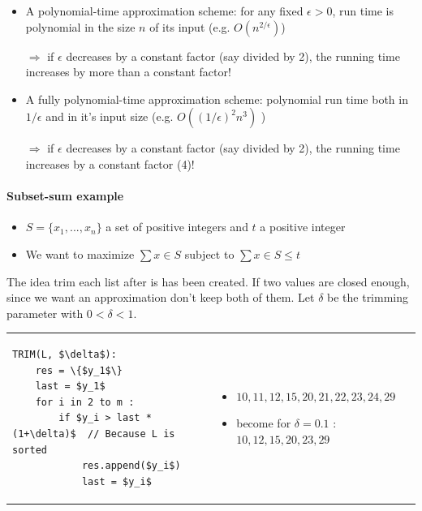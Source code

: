 \begin{itemize}
    \item A polynomial-time approximation scheme: for any fixed
        $\epsilon > 0$, run time is polynomial in the size $n$ of its input
        (e.g. $O(n^{2/\epsilon} )$)
\begin{center}
    $\Rightarrow$ if $\epsilon$ decreases by a constant factor (say divided by 2),
the running time increases by more than a constant
factor!
\end{center}

    \item A fully polynomial-time approximation scheme:
        polynomial run time both in $1/\epsilon$ and in it’s input size
        (e.g. $O((1/\epsilon)^2 n^3)$ )
\begin{center}
    $\Rightarrow$ if $\epsilon$ decreases by a constant factor (say divided by 2),
    the running time increases by a constant factor (4)!
\end{center}

\end{itemize}

\paragraph{Subset-sum example}
\begin{itemize}
\item $S= \{x_1,...,x_n\}$ a set of positive integers and $t$ a positive integer 
    \item We want to
maximize $\sum x \in S$ subject to $\sum x \in S \leq t$
\end{itemize}


The idea trim each list after is has been created. If two
values are closed enough, since we want an
approximation don’t keep both of them. Let $\delta$ be the
trimming parameter with $0 < \delta < 1$.

\begin{tabular}{m{7cm}m{7cm}}
\begin{lstlisting}[mathescape]
TRIM(L, $\delta$):
    res = \{$y_1$\}
    last = $y_1$
    for i in 2 to m :
        if $y_i > last * (1+\delta)$  // Because L is sorted
            res.append($y_i$)
            last = $y_i$
    \end{lstlisting}
    & 
    \begin{itemize}
        \item $10, 11, 12, 15, 20, 21, 22, 23, 24, 29$
        \item become for $\delta = 0.1$ : $10, 12, 15, 20, 23, 29$
    \end{itemize}
\end{tabular}

